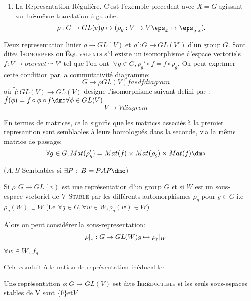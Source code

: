 \begin{examplebox}
\begin{enumerate}
		\item La Representation Régulière. C'est l'exemple precedent avec $X=G$ agissant sur lui-même translation à gauche:
		$$ \rho: G\rightarrow  GL(v)\\g\mapsto(\rho_g:V\rightarrow  V\\\eps_x\mapsto \eps_{g\cdot x}).$$
		
	\end{enumerate}
\end{examplebox}

\begin{definition}
	Deux representation linier $\rho \rightarrow  GL(V)$ et $\rho':G\rightarrow  GL(V')$ d'un group $G$. Sont dites \textsc{Isomorphes} ou \textsc{Équivalents} s'il existe un isomorphisme d'espace vectoriels $f:V\rightarrow  overset \simeq V'$ tel que l'on ont: $\forall g\in G, \rho_g'\circ f= f\circ\rho_g$. On peut exprimer cette condition par la commutativité diagramme:
	$$G\rightarrow \rho GL(V)f asdfdiagram$$
	où $\tilde f: GL(V)\rightarrow GL(V)$ designe l'isomorphisme suivant defini par :$\tilde f(\phi)=f\circ\phi\circ f\dmo \forall\phi\in GL(V)$
	$$V\rightarrow V diagram$$
	
\end{definition}

En termes de matrices, ce la signifie que les matrices associés à la premier represantion sont semblables à leurs homologués dans la seconde, via la même matrice de passage:
$$\forall g\in G, Mat(\rho'_g)=Mat(f)\times Mat(\rho_g)\times Mat(f)\dmo$$

($A,B$ Semblables si $\exists P:\ B=PAP\dmo$)

Si $\rho:G\rightarrow GL(v)$ est une représentation d'un group $G$ et si $W$ est un sous-espace vectoriel de V \textsc{Stable} par les différents automorphismes $\rho_g$ pour $g\in G$ i.e $\rho_g(W)\subset W$ (i.e $\forall g\in G, \forall w\in W, \rho_g(w)\in W$)

Alors on peut considérer la sous-representation:
$$\rho|_x:G\rightarrow  GL(W)\\ g\mapsto\rho_g|_W$$

\begin{remark}
	$\forall w\in W,\ f_g$
\end{remark}
Cela conduit à le notion de représentation inéducable:
\begin{definition}
	Une représentation $\rho: G\rightarrow  GL(V)$ est dite \textsc{Irréductible} si les seuls sous-espaces stables de V sont $\{0\} $et$ V$.
\end{definition}

